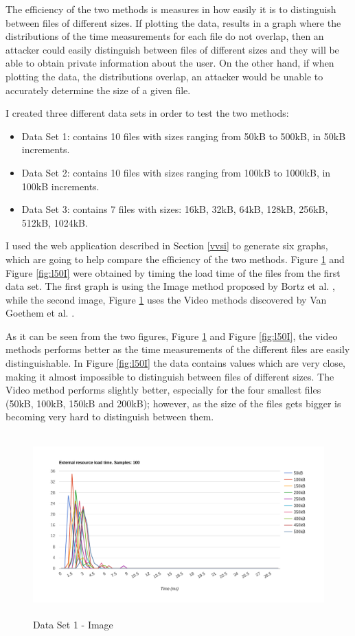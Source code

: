 \documentclass[10pt,a4paper,twoside]{book}
\begin{document}
The efficiency of the two methods is measures in how easily it is to distinguish between files of different sizes. If plotting the data, results in a graph where the distributions of the time measurements for each file do not overlap, then an attacker could easily distinguish between files of different sizes and they will be able to obtain private information about the user. On the other hand, if when plotting the data, the distributions overlap, an attacker would be unable to accurately determine the size of a given file.

I created three different data sets in order to test the two methods:
\begin{itemize}
\item Data Set 1: contains 10 files with sizes ranging from 50kB to 500kB, in 50kB increments.
\item Data Set 2: contains 10 files with sizes ranging from 100kB to 1000kB, in 100kB increments.
\item Data Set 3: contains 7 files with sizes: 16kB, 32kB, 64kB, 128kB, 256kB, 512kB, 1024kB.
\end{itemize}

I used the web application described in Section \ref{vvsi} to generate six graphs, which are going to help compare the efficiency of the two methods. Figure \ref{fig:l50V} and Figure \ref{fig:l50I} were obtained by timing the load time of the files from the first data set. The first graph is using the Image method proposed by Bortz et al. \cite{bortz2007exposing}, while the second image, Figure \ref{fig:l50V} uses the Video methods discovered by Van Goethem et al. \cite{van2015clock}.

As it can be seen from the two figures, Figure \ref{fig:l50V} and Figure \ref{fig:l50I}, the video methods performs better as the time measurements of the different files are easily distinguishable. In Figure \ref{fig:l50I} the data contains values which are very close, making it almost impossible to distinguish between files of different sizes. The Video method performs slightly better, especially for the four smallest files (50kB, 100kB, 150kB and 200kB); however, as the size of the files gets bigger is becoming very hard to distinguish between them.

\begin{figure}[h]
\centering
\includegraphics[width=\textwidth, height=7cm]{figures/i100L50H.png}
\caption{Data Set 1 - Image}
\label{fig:l50V}
\end{figure}
\end{document}
